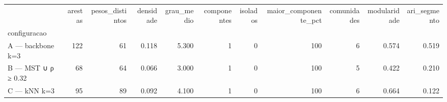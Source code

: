 \begin{tabular}{lrrrrrrrrrr}
\toprule
 & arestas & pesos\_distintos & densidade & grau\_medio & componentes & isolados & maior\_componente\_pct & comunidades & modularidade & ari\_segmento \\
configuracao &  &  &  &  &  &  &  &  &  &  \\
\midrule
A — backbone k=3 & 122 & 61 & 0.118 & 5.300 & 1 & 0 & 100 & 6 & 0.574 & 0.519 \\
B — MST ∪ ρ ≥ 0.32 & 68 & 64 & 0.066 & 3.000 & 1 & 0 & 100 & 5 & 0.422 & 0.210 \\
C — kNN k=3 & 95 & 89 & 0.092 & 4.100 & 1 & 0 & 100 & 6 & 0.664 & 0.122 \\
\bottomrule
\end{tabular}
